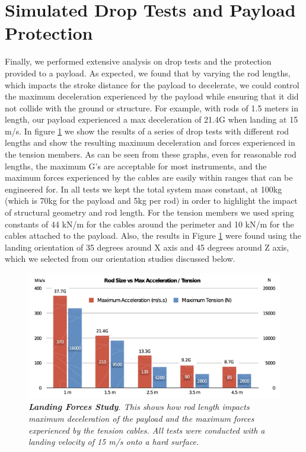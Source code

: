 \section{Simulated Drop Tests and Payload Protection}

Finally, we performed extensive analysis on drop tests and the protection provided to a payload.   As expected, we found that by varying the rod lengths, which impacts the stroke distance for the payload to decelerate, we could control the maximum deceleration experienced by the payload while ensuring that it did not collide with the ground or structure.  For example, with rods of 1.5 meters in length, our payload experienced a max deceleration of 21.4G when landing at 15 m/s. In figure \ref{fig:rodvsG} we show the results of a series of drop tests with different rod lengths and show the resulting maximum deceleration and forces experienced in the tension members.   As can be seen from these graphs, even for reasonable rod lengths, the maximum G's are acceptable for most instruments, and the maximum forces experienced by the cables are easily within ranges that can be engineered for.  In all tests we kept the total system mass constant, at 100kg (which is 70kg for the payload and 5kg per rod) in order to highlight the impact of structural geometry and rod length.  For the tension members we used spring constants of 44 kN/m for the cables around the perimeter and 10 kN/m for the cables attached to the payload.  Also, the results in Figure \ref{fig:rodvsG} were found using the landing orientation of 35 degrees around X axis and 45 degrees around Z axis, which we selected from our orientation studies discussed below. 

\begin{figure}[htbp]
\centering
\includegraphics[width=0.8\columnwidth]{tex/images/rodvsG_fixed2}
\caption{{\em {\bf Landing Forces Study}. This shows how rod length impacts maximum deceleration of the payload and  the maximum forces experienced by the tension cables.  All tests were conducted with a landing velocity of 15 m/s onto a hard surface.}}
\label{fig:rodvsG}
\end{figure}

